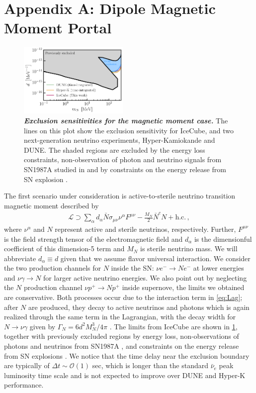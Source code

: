 \section{Appendix A: Dipole Magnetic Moment Portal}
\begin{figure}[t!]
    \centering
    \includegraphics[width=0.47\textwidth]{figures/magnetic_moment_sensitivity}
    \caption{\textbf{\textit{Exclusion sensitivities for the magnetic moment case.}}
    The lines on this plot show the exclusion sensitivity for IceCube, and two next-generation neutrino experiments, Hyper-Kamiokande and DUNE. The shaded regions are excluded by the energy loss constraints, non-observation of photon and neutrino signals from SN1987A studied in \cite{Brdar:2023tmi} and by constraints on the energy release from SN explosion \cite{PhysRevLett.128.221103, Chauhan:2023sci, chauhan2024probing}. 
    }
    \label{fig:magnetic_moment_sensitivity}
\end{figure}
The first scenario under consideration is active-to-sterile neutrino transition magnetic moment described by \cite{Magill:2018jla,Brdar:2020quo,Brdar:2023tmi}
\begin{align}
    \mathcal{L} \supset \sum_\alpha d_\alpha \bar{N}\sigma_{\mu\nu} \nu^{\alpha} F^{\mu\nu}-\frac{M_N}{2} \bar{N}^c N + \text{h.c.}\,,
    \label{eq:Lag}
\end{align}
where $\nu^{\alpha}$ and $N$ represent active and sterile neutrinos, respectively. Further, $F^{\mu\nu}$ is the field strength tensor of the electromagnetic field and $d_\alpha$ is the dimensionful coefficient of this dimension-5 term and $M_N$ is sterile neutrino mass. We will abbreviate $d_\alpha \equiv d$ given that we assume flavor universal interaction. We consider the two production channels for $N$ inside the SN: $\nu e^- \to N e^-$ at lower energies and $\nu \gamma \to N$ for larger active neutrino energies. We also point out by neglecting the $N$ production channel $\nu p^+\to N p^+$ inside supernove, the limits we obtained are conservative. Both processes occur due to the interaction term in \cref{eq:Lag}; after $N$ are produced, they decay to active neutrinos and photons which is again realized through the same term in the Lagrangian, with the decay width for $N\to\nu\gamma$ given by $\Gamma_N = 6d^2 M_N^3/4 \pi$ \cite{Plestid:2020vqf}. The limits from IceCube are shown in \cref{fig:magnetic_moment_sensitivity}, together with previously excluded regions by energy loss, non-observations of photons and neutrinos from SN1987A \cite{Brdar:2023tmi}, and constraints on the energy release from SN explosions \cite{PhysRevLett.128.221103,chauhan2024probing}.
We notice that the time delay near the exclusion boundary are typically of $\Delta t \sim \mathcal{O}(1)$ sec, which is longer than the standard $\bar{\nu}_e$ peak luminosity time scale and is not expected to improve over DUNE and Hyper-K performance. 